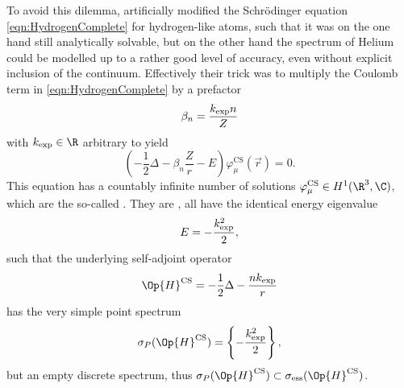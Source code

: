 To avoid this dilemma, \citet{Shull1959} artificially modified
the Schrödinger equation \eqref{eqn:HydrogenComplete}
for hydrogen-like atoms,
such that it was on the one hand still analytically solvable,
but on the other hand the spectrum of Helium could be modelled
up to a rather good level of accuracy,
even without explicit inclusion of the continuum.
Effectively their trick was to multiply the Coulomb term
in \eqref{eqn:HydrogenComplete} by a prefactor
\begin{equation}
	\beta_n = \frac{k_\text{exp} n}{Z}
	\label{eqn:CSbeta}
\end{equation}
with $\kexp \in \R$ arbitrary to yield
\begin{equation}
	\left( - \frac12 \Delta - \beta_n \frac{Z}{r} - E \right) \varphi^\text{CS}_\mu(\vec{r}) = 0.
	\label{eqn:CS}
\end{equation}
This equation has a countably infinite number of solutions
$\varphi^\text{CS}_\mu \in H^1(\R^3, \C)$,
which are the so-called .
They are ,
\ie all have the identical energy eigenvalue
\begin{equation}
	E = -\frac{k_\text{exp}^2}{2},
	\label{eqn:CSenergy}
\end{equation}
such that the underlying self-adjoint operator
\[ \Op{H}^\text{CS} = - \frac12 \Delta - \frac{n\kexp}{r} \]
has the very simple point spectrum
\[ \sigma_P(\Op{H}^\text{CS}) = \left\{ -\frac{\kexp^2}{2} \right\}, \]
but an empty discrete spectrum,
thus $\sigma_P(\Op{H}^\text{CS}) \subset \sigma_\text{ess}(\Op{H}^\text{CS})$.

